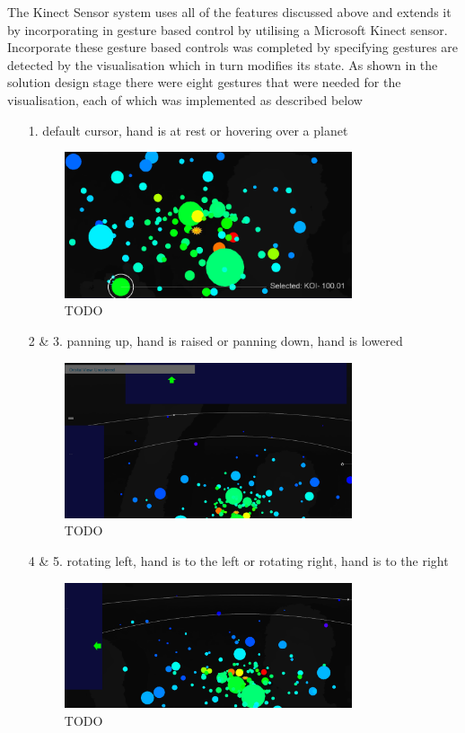 The Kinect Sensor system uses all of the features discussed above and extends it
by incorporating in gesture based control by utilising a Microsoft Kinect
sensor. Incorporate these gesture based controls was completed by specifying
gestures are detected by the visualisation which in turn modifies its state. As
shown in the solution design stage there were eight gestures that were needed
for the visualisation, each of which was implemented as described below
\begin{enumerate}
 \item[1.] default cursor, hand is at rest or hovering over a planet
 
\begin{figure}[H]
  \centering
      \includegraphics[width=0.8\textwidth]{images/select.PNG}
  \caption{TODO}
  \label{fig:left}
\end{figure}

 \item[2 \& 3.] panning up, hand is raised or panning down, hand is lowered
 \begin{figure}[H]
  \centering
      \includegraphics[width=0.8\textwidth]{images/up.PNG}
  \caption{TODO}
  \label{fig:up}
\end{figure}
 
 \item[4 \& 5.] rotating left, hand is to the left or rotating right, hand is to
the right
 
\begin{figure}[H]
  \centering
      \includegraphics[width=0.8\textwidth]{images/left.PNG}
  \caption{TODO}
  \label{fig:left}
\end{figure}


\end{enumerate}
